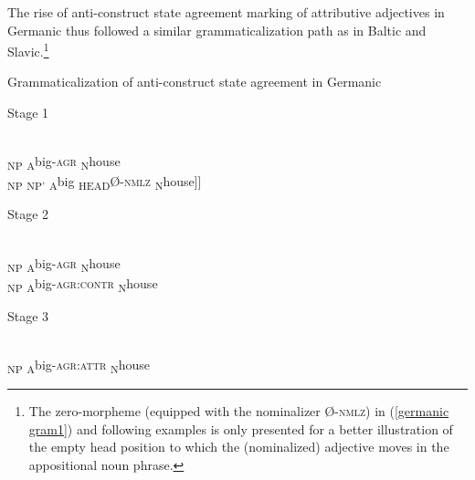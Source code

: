 {The rise of anti\hyp{}construct state agreement marking of attributive adjectives in Germanic thus followed a similar grammaticalization path as in Baltic and Slavic.\footnote{The zero-morpheme (equipped with the nominalizer Ø-\textsc{nmlz}) in (\ref{germanic gram1}) and following examples is only presented for a better illustration of the empty head position to which the (nominalized) adjective moves in the appositional noun phrase.}
\begin{exe}
\ex
{\upshape Grammaticalization of anti\hyp{}construct state agreement in Germanic}
\label{germanic gram1} 
\begin{xlist}
\ex
\label{germanic1}
	{\upshape Stage 1}
\begin{xlist}
\\
{\ob}\textsubscript{\upshape NP} \textsubscript{\upshape A}big{\rm -\textsc{agr}} \textsubscript{\upshape N}house{\cb}
\\
\label{germanic art1}
{\ob}\textsubscript{\upshape NP} {\ob}\textsubscript{\upshape NP'} \textsubscript{\upshape A}big \textsubscript{\upshape HEAD}{\rm Ø-\textsc{nmlz}}{\cb} \textsubscript{\upshape N}house{\upshape ]]}
\end{xlist}
\ex
\label{germanic2}
	{\upshape Stage 2} 
\begin{xlist}
\\
{\ob}\textsubscript{\upshape NP} \textsubscript{\upshape A}big{\rm -\textsc{agr}} \textsubscript{\upshape N}house{\cb}
\\
\label{germanic ACAgr}
{\ob}\textsubscript{\upshape NP} \textsubscript{\upshape A}big{\rm -\textsc{agr:contr}} \textsubscript{\upshape N}house{\cb}
\end{xlist}
\ex
\label{germanic3}
	{\upshape Stage 3}
\begin{xlist}
\\
{\ob}\textsubscript{\upshape NP} \textsubscript{\upshape A}big{\rm -\textsc{agr:attr}} \textsubscript{\upshape N}house{\cb}
\end{xlist}
\end{xlist}
\end{exe}

}
